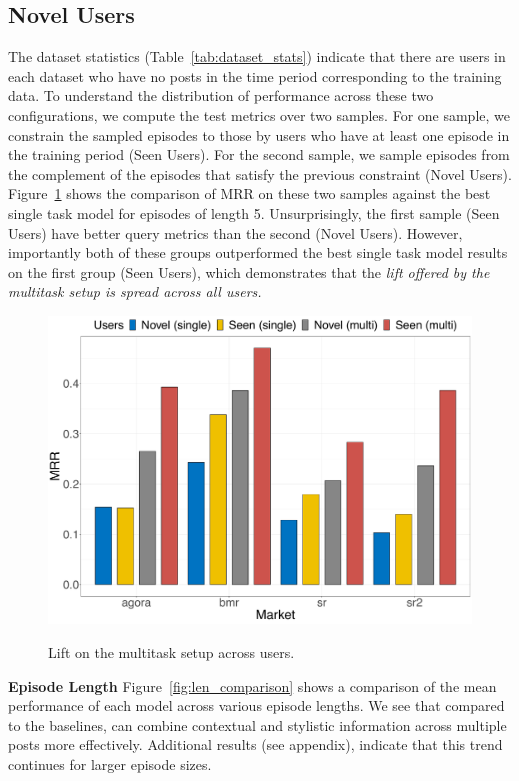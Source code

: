 \subsection{Novel Users}
The dataset statistics (Table~\ref{tab:dataset_stats}) indicate that there are users in each dataset who have no posts in the time period corresponding to the training data. 
To understand the distribution of performance across these two configurations, we compute the test metrics over two samples.
For one sample, we constrain the sampled episodes to those by users who have at least one episode in the training period (Seen Users).
For the second sample, we sample episodes from the complement of the episodes that satisfy the previous constraint (Novel Users).
Figure~\ref{fig:novel_vs_train_comparison} shows the comparison of MRR on these two samples against the best single task model for episodes of length 5. 
Unsurprisingly, the first sample (Seen Users) have better query metrics than the second (Novel Users).
However, importantly both of these groups outperformed the best single task model results on the first group (Seen Users), which demonstrates that the {\it lift offered by the multitask setup is spread across all users.} 

\begin{figure}
    \centering
    \includegraphics[width=0.8\linewidth,alt={Bar chart showing the lift provided by using the multitask setup across both seen and novel users.}]{sysml/plots/novel_vs_train_vs_single.png}
    \caption{Lift on the multitask setup across users.}
    \label{fig:novel_vs_train_comparison}
\end{figure}

\noindent \textbf{Episode Length}  Figure~\ref{fig:len_comparison} shows a comparison of the mean performance of each model across various episode lengths. We see that compared to the baselines, \SYSMLmethodname{} can combine contextual and stylistic information across multiple posts more effectively. Additional results (see appendix),  indicate that this trend continues for larger episode sizes.

